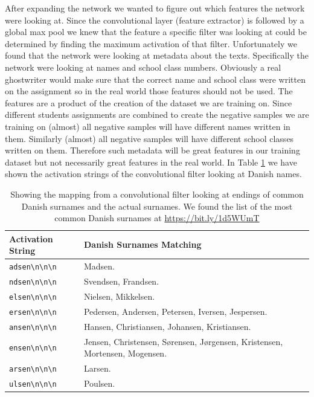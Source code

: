 After expanding the network we wanted to figure out which features the network
were looking at. Since the convolutional layer (feature extractor) is followed
by a global max pool we knew that the feature a specific filter was looking
at could be determined by finding the maximum activation of that filter.
Unfortunately we found that the network were looking at metadata about the
texts. Specifically the network were looking at names and school class numbers.
Obviously a real ghostwriter would make sure that the correct name and school
class were written on the assignment so in the real world those features should
not be used. The features are a product of the creation of the dataset we are
training on. Since different students assignments are combined to create the
negative samples we are training on (almost) all negative samples will have
different names written in them. Similarly (almost) all negative samples will
have different school classes written on them. Therefore such metadata will be
great features in our training dataset but not necessarily great features in
the real world. In Table \ref{tab:name_features} we have shown the activation
strings of the convolutional filter looking at Danish names.

\begin{table}
    \begin{tabular}{ll}
        \textbf{Activation String} & \textbf{Danish Surnames Matching} \\
        \hline
        \verb!adsen\n\n\n! & Madsen. \\
        \verb!ndsen\n\n\n! & Svendsen, Frandsen. \\
        \verb!elsen\n\n\n! & Nielsen, Mikkelsen. \\
        \verb!ersen\n\n\n! & Pedersen, Andersen, Petersen, Iversen, Jespersen. \\
        \verb!ansen\n\n\n! & Hansen, Christiansen, Johansen, Kristiansen. \\
        \verb!ensen\n\n\n! & Jensen, Christensen, S\o rensen, J\o rgensen,
                             Kristensen, Mortensen, Mogensen. \\
        \verb!arsen\n\n\n! & Larsen. \\
        \verb!ulsen\n\n\n! & Poulsen.
    \end{tabular}
    \caption{Showing the mapping from a convolutional filter looking at endings
        of common Danish surnames and the actual surnames. We found the list of
        the most common Danish surnames at \url{https://bit.ly/1d5WUmT}}
    \label{tab:name_features}
\end{table}


